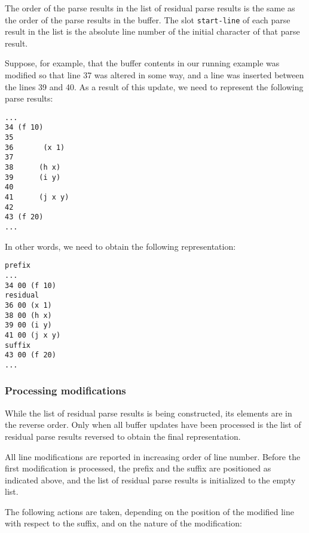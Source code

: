 The order of the parse results in the list of residual parse results
is the same as the order of the parse results in the buffer.  The slot
\texttt{start-line} of each parse result in the list is the absolute
line number of the initial character of that parse result.

Suppose, for example, that the buffer contents in our running example
was modified so that line 37 was altered in some way, and a line was
inserted between the lines 39 and 40.  As a result of this update, we
need to represent the following parse results:

\begin{verbatim}
...
34 (f 10)
35
36       (x 1)
37
38      (h x)
39      (i y)
40
41      (j x y)
42
43 (f 20)
...
\end{verbatim}

In other words, we need to obtain the following representation:

\begin{verbatim}
prefix
...
34 00 (f 10)
residual
36 00 (x 1)
38 00 (h x)
39 00 (i y)
41 00 (j x y)
suffix
43 00 (f 20)
...
\end{verbatim}

\subsubsection{Processing modifications}

While the list of residual parse results is being constructed, its
elements are in the reverse order.  Only when all buffer updates have
been processed is the list of residual parse results reversed to
obtain the final representation.

All line modifications are reported in increasing order of line
number.  Before the first modification is processed, the prefix and
the suffix are positioned as indicated above, and the list of residual
parse results is initialized to the empty list.

The following actions are taken, depending on the position of the
modified line with respect to the suffix, and on the nature of the
modification:

